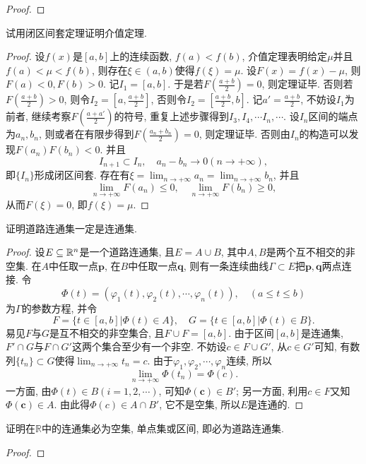 \begin{quiza}
\begin{proof}
\end{proof}
\woe 试用闭区间套定理证明介值定理.
\begin{proof}
设\(f(x)\)是\([a,b]\)上的连续函数, \(f(a)<f(b)\), 介值定理表明给定\(\mu\)并且\(f(a)<\mu<f(b)\), 则存在\(\xi\in(a,b)\)使得\(f(\xi)=\mu.\) 设\(F(x)=f(x)-\mu\), 则\(F(a)<0, F(b)>0\). 记\(I_1=[a,b]\). 于是若\(F\left(\frac{a+b}{2}\right)=0\), 则定理证毕. 否则若\(F\left(\frac{a+b}{2}\right)>0\), 则令\(I_2=\left[a,\frac{a+b}{2}\right]\), 否则令\(I_2=\left[\frac{a+b}{2},b\right]\). 记\(a'=\frac{a+b}{2}\), 不妨设\(I_1\)为前者, 继续考察\(F\left(\frac{a+a'}{2}\right)\)的符号, 重复上述步骤得到\(I_3,I_4,\cdots I_n,\cdots\). 设\(I_n\)区间的端点为\(a_n,b_n\), 则或者在有限步得到\(F\left(\frac{a_n+b_n}{2}\right)=0\), 则定理证毕.
否则由\(I_n\)的构造可以发现\(F(a_n)F(b_n)<0\). 并且\[I_{n+1}\subset I_{n},\quad a_n-b_n\rightarrow 0(n\rightarrow+\infty),\]即\(\{I_n\}\)形成闭区间套. 存在有\(\xi=\lim_{n\rightarrow+\infty}a_n=\lim_{n\rightarrow+\infty}b_n\), 并且\[\lim_{n\rightarrow+\infty}F(a_n)\leqslant 0,\quad\lim_{n\rightarrow+\infty}F(b_n)\geqslant 0,\]从而\(F(\xi)=0\), 即\(f(\xi)=\mu.\)
\end{proof}
\woe 证明道路连通集一定是连通集.
\begin{proof}
设\(E\subseteq\mathbb{R}^n\)是一个道路连通集, 且\(E=A\cup B\), 其中\(A,B\)是两个互不相交的非空集. 在\(A\)中任取一点\(\boldsymbol{p}\), 在\(B\)中任取一点\(\boldsymbol{q}\), 则有一条连续曲线\(\varGamma\subset E\)把\(\boldsymbol{p,q}\)两点连接. 令\[\boldsymbol{\varPhi}(t)=\left(\varphi_1(t),\varphi_2(t),\cdots,\varphi_n(t)\right),\quad (a\leqslant t\leqslant b)\]为\(\varGamma\)的参数方程, 并令\[F=\{t\in[a,b]\big|\boldsymbol{\varPhi}(t)\in A\},\quad G=\{t\in[a,b]\big|\boldsymbol{\varPhi}(t)\in B\}.\]易见\(F\)与\(G\)是互不相交的非空集合, 且\(F\cup F=[a,b]\). 由于区间\([a,b]\)是连通集, \(F'\cap G\)与\(F\cap G'\)这两个集合至少有一个非空. 不妨设\(c\in F\cup G'\), 从\(c\in G'\)可知, 有数列\(\{t_n\}\subset G\)使得\(\lim_{n\rightarrow+\infty}t_n=c\). 由于\(\varphi_1,\varphi_2,\cdots,\varphi_n\)连续, 所以\[\lim_{n\rightarrow+\infty}\boldsymbol{\varPhi}(t_n)=\boldsymbol{\varPhi}(c).\]一方面, 由\(\boldsymbol{\varPhi}(t)\in B(i=1,2,\cdots)\), 可知\(\boldsymbol{\varPhi(c)}\in B'\); 另一方面, 利用\(c\in F\)又知\(\boldsymbol{\varPhi(c)}\in A\). 由此得\(\boldsymbol{\varPhi}(c)\in A\cap B'\), 它不是空集, 所以\(E\)是连通的.
\end{proof}
\woe 证明在\(\mathbb{R}\)中的连通集必为空集, 单点集或区间, 即必为道路连通集.
\begin{proof}


\end{proof}
\end{quiza}
